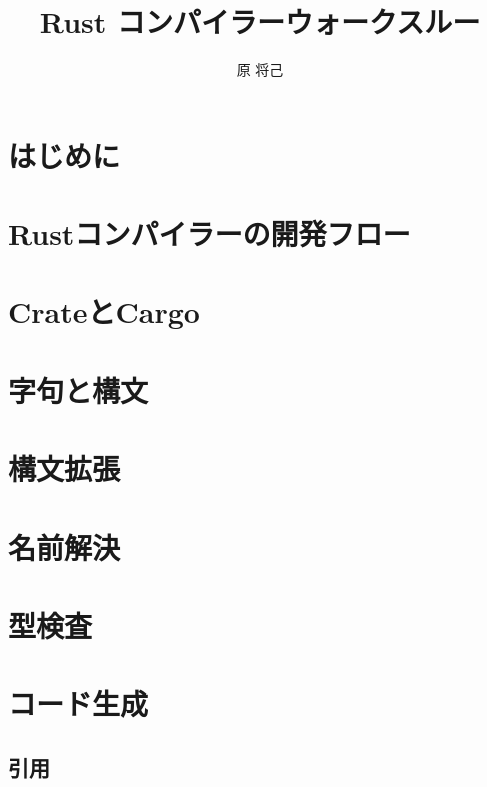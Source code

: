 \documentclass[dvipdfmx,uplatex,papersize,a4paper,10pt]{jsbook}
\title{Rust コンパイラーウォークスルー}
\author{原 将己}
\theoremstyle{definition}
\begin{document}
\maketitle

\tableofcontents

\chapter{はじめに}

\chapter{Rustコンパイラーの開発フロー}

\chapter{CrateとCargo}

\chapter{字句と構文}

\chapter{構文拡張}

\chapter{名前解決}

\chapter{型検査}

\chapter{コード生成}

\section{引用}



\end{document}

